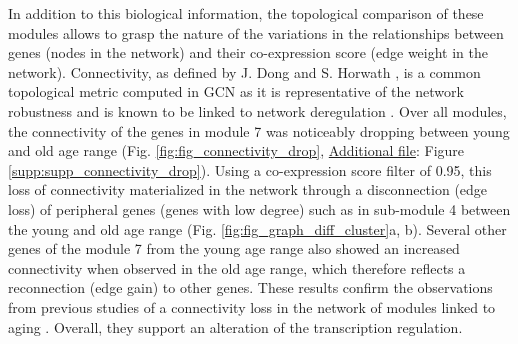 In addition to this biological information, the topological comparison of these modules allows to grasp the nature of the variations in the relationships between genes (nodes in the network) and their co-expression score (edge weight in the network). Connectivity, as defined by J. Dong and S. Horwath , is a common topological metric computed in GCN as it is representative of the network robustness and is known to be linked to network deregulation . Over all modules, the connectivity of the genes in module 7 was noticeably dropping between young and old age range (Fig. \ref{fig:fig_connectivity_drop}, \hyperref[annexe:supp_file_GWENA]{Additional file}: Figure \ref{supp:supp_connectivity_drop}). 
Using a co-expression score filter of 0.95, this loss of connectivity materialized in the network through a disconnection (edge loss) of peripheral genes (genes with low degree) such as in sub-module 4 between the young and old age range (Fig. \ref{fig:fig_graph_diff_cluster}a, b). Several other genes of the module 7 from the young age range also showed an increased connectivity when observed in the old age range, which therefore reflects a reconnection (edge gain) to other genes. These results confirm the observations from previous studies of a connectivity loss in the network of modules linked to aging . Overall, they support an alteration of the transcription regulation.

